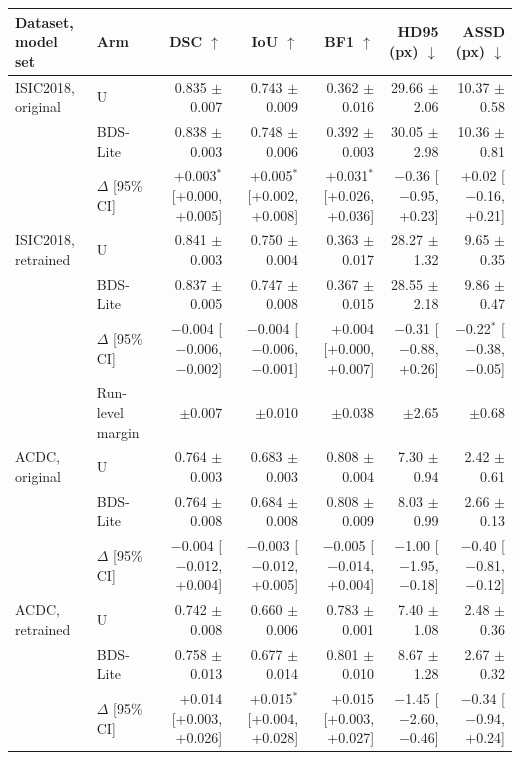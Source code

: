 \begin{tabular}{llrrrrr}
\toprule
Dataset, model set & Arm & DSC $\uparrow$ & IoU $\uparrow$ & BF1 $\uparrow$ & HD95 (px) $\downarrow$ & ASSD (px) $\downarrow$ \\
\midrule
ISIC2018, original & U & 0.835 $\pm$ 0.007 & 0.743 $\pm$ 0.009 & 0.362 $\pm$ 0.016 & 29.66 $\pm$ 2.06 & 10.37 $\pm$ 0.58 \\
 & BDS-Lite & 0.838 $\pm$ 0.003 & 0.748 $\pm$ 0.006 & 0.392 $\pm$ 0.003 & 30.05 $\pm$ 2.98 & 10.36 $\pm$ 0.81 \\
 & $\Delta$ [95\% CI] & +0.003$^{*}$ [+0.000, +0.005] & +0.005$^{*}$ [+0.002, +0.008] & +0.031$^{*}$ [+0.026, +0.036] & $-$0.36 [$-$0.95, +0.23] & +0.02 [$-$0.16, +0.21] \\
\addlinespace
ISIC2018, retrained & U & 0.841 $\pm$ 0.003 & 0.750 $\pm$ 0.004 & 0.363 $\pm$ 0.017 & 28.27 $\pm$ 1.32 & 9.65 $\pm$ 0.35 \\
 & BDS-Lite & 0.837 $\pm$ 0.005 & 0.747 $\pm$ 0.008 & 0.367 $\pm$ 0.015 & 28.55 $\pm$ 2.18 & 9.86 $\pm$ 0.47 \\
 & $\Delta$ [95\% CI] & $-$0.004 [$-$0.006, $-$0.002] & $-$0.004 [$-$0.006, $-$0.001] & +0.004 [+0.000, +0.007] & $-$0.31 [$-$0.88, +0.26] & $-$0.22$^{*}$ [$-$0.38, $-$0.05] \\
\addlinespace
 & Run-level margin & $\pm$0.007 & $\pm$0.010 & $\pm$0.038 & $\pm$2.65 & $\pm$0.68 \\
\midrule
ACDC, original & U & 0.764 $\pm$ 0.003 & 0.683 $\pm$ 0.003 & 0.808 $\pm$ 0.004 & 7.30 $\pm$ 0.94 & 2.42 $\pm$ 0.61 \\
 & BDS-Lite & 0.764 $\pm$ 0.008 & 0.684 $\pm$ 0.008 & 0.808 $\pm$ 0.009 & 8.03 $\pm$ 0.99 & 2.66 $\pm$ 0.13 \\
 & $\Delta$ [95\% CI] & $-$0.004 [$-$0.012, +0.004] & $-$0.003 [$-$0.012, +0.005] & $-$0.005 [$-$0.014, +0.004] & $-$1.00 [$-$1.95, $-$0.18] & $-$0.40 [$-$0.81, $-$0.12] \\
\addlinespace
ACDC, retrained & U & 0.742 $\pm$ 0.008 & 0.660 $\pm$ 0.006 & 0.783 $\pm$ 0.001 & 7.40 $\pm$ 1.08 & 2.48 $\pm$ 0.36 \\
 & BDS-Lite & 0.758 $\pm$ 0.013 & 0.677 $\pm$ 0.014 & 0.801 $\pm$ 0.010 & 8.67 $\pm$ 1.28 & 2.67 $\pm$ 0.32 \\
 & $\Delta$ [95\% CI] & +0.014 [+0.003, +0.026] & +0.015$^{*}$ [+0.004, +0.028] & +0.015 [+0.003, +0.027] & $-$1.45 [$-$2.60, $-$0.46] & $-$0.34 [$-$0.94, +0.24] \\

\end{tabular}
